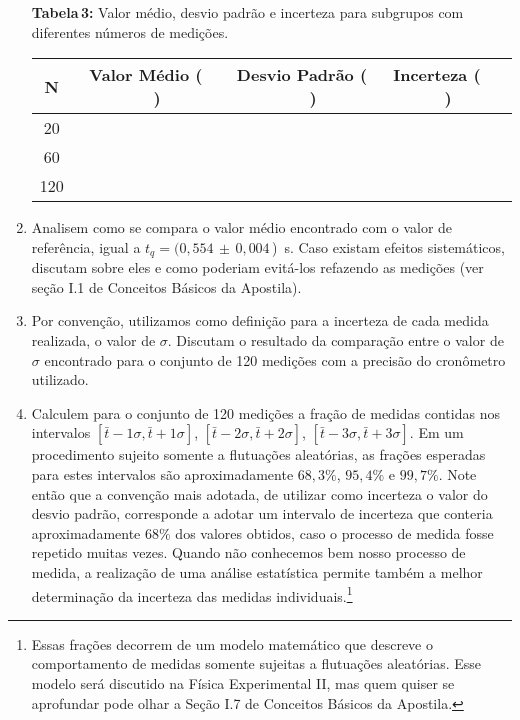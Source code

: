 \begin{enumerate}
\begin{center}
{{\bf Tabela\,3:} Valor médio, desvio padrão e incerteza para subgrupos com diferentes números de medições.}

  \begin{tabular}{|c|c|c|c|} \hline
  \bf N & \bf Valor Médio ($\;\;\;\;\;$)& \bf Desvio Padrão ($\;\;\;\;\;$) &  \bf Incerteza ($\;\;\;\;\;$)\\ \hline
   20 & & & \\ \hline
   60 & & & \\ \hline
  120 & & & \\ \hline
\end{tabular}
\label{tab:2060120med}
\end{center}
\vspace{0.3cm}

\item Analisem como se compara o valor médio encontrado com o valor de referência, igual a $t_{q}= (0,554\,\pm\,0,004\,$)~s.  Caso existam efeitos sistemáticos, discutam sobre eles e como poderiam evitá-los refazendo as medições (ver seção I.1  de Conceitos Básicos da Apostila).

\item Por convenção, utilizamos como definição para a incerteza de cada medida realizada, o valor de $\sigma$. Discutam o resultado da comparação entre o valor de $\sigma$ encontrado para o conjunto de 120 medições com a precisão do cronômetro utilizado.  

\item Calculem para o conjunto de 120 medições a fração de medidas contidas nos intervalos $[\bar{t}-1\sigma, \bar{t}+1\sigma]$, 
$[\bar{t}-2\sigma, \bar{t}+2\sigma]$, $[\bar{t}-3\sigma, \bar{t}+3 \sigma]$.  Em um procedimento sujeito somente a flutuações aleatórias, as frações esperadas para estes intervalos são aproximadamente $68,3\%$, $95,4\%$ e $99,7\%$. Note então que a convenção mais adotada, de utilizar como incerteza o valor do desvio padrão, corresponde a adotar um intervalo de incerteza que conteria aproximadamente $68\%$ dos valores obtidos, caso o processo de medida fosse repetido muitas vezes. Quando não conhecemos bem nosso processo de medida, a realização de uma análise estatística permite também a melhor determinação da incerteza das medidas individuais.\footnote{Essas frações decorrem de um modelo matemático que descreve o comportamento de medidas somente sujeitas a flutuações aleatórias. Esse modelo será discutido na Física Experimental II, mas quem quiser se aprofundar pode olhar a Seção  I.7 %
 de Conceitos Básicos da Apostila.} 

\end{enumerate}


